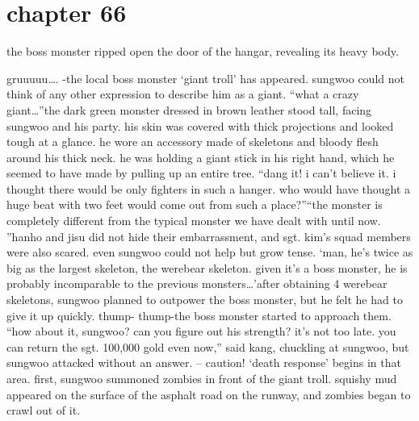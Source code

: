 \section{chapter 66}

                            the boss monster ripped open the door of the hangar, revealing its heavy body.





gruuuuu….
-the local boss monster ‘giant troll’ has appeared.
sungwoo could not think of any other expression to describe him as a giant.
“what a crazy giant…”the dark green monster dressed in brown leather stood tall, facing sungwoo and his party.
his skin was covered with thick projections and looked tough at a glance.
 he wore an accessory made of skeletons and bloody flesh around his thick neck.
he was holding a giant stick in his right hand, which he seemed to have made by pulling up an entire tree.
“dang it! i can’t believe it.
 i thought there would be only fighters in such a hanger.
 who would have thought a huge beat with two feet would come out from such a place?”“the monster is completely different from the typical monster we have dealt with until now.
”hanho and jisu did not hide their embarrassment, and sgt.
 kim’s squad members were also scared.
 even sungwoo could not help but grow tense.
‘man, he’s twice as big as the largest skeleton, the werebear skeleton.
 given it’s a boss monster, he is probably incomparable to the previous monsters…’after obtaining 4 werebear skeletons, sungwoo planned to outpower the boss monster, but he felt he had to give it up quickly.
thump- thump-the boss monster started to approach them.
“how about it, sungwoo? can you figure out his strength? it’s not too late.
 you can return the sgt.
 100,000 gold even now,” said kang, chuckling at sungwoo, but sungwoo attacked without an answer.
– caution! ‘death response’ begins in that area.
first, sungwoo summoned zombies in front of the giant troll.
 squishy mud appeared on the surface of the asphalt road on the runway, and zombies began to crawl out of it.

